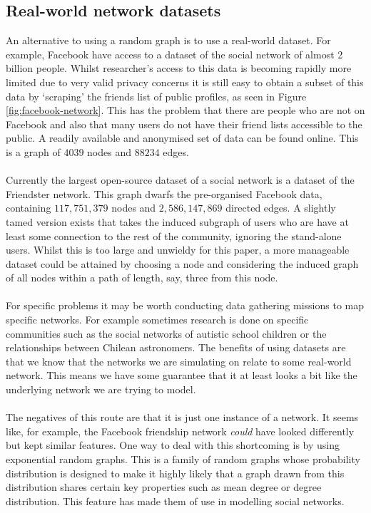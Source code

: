 \subsection{Real-world network datasets}
An alternative to using a random graph is to use a real-world dataset. For example, Facebook have access to a dataset of the social network of almost 2 billion people\cite{num-fb-users}. Whilst researcher's access to this data is becoming rapidly more limited due to very valid privacy concerns it is still easy to obtain a subset of this data by `scraping' the friends list of public profiles, as seen in Figure \ref{fig:facebook-network}. This has the problem that there are people who are not on Facebook and also that many users do not have their friend lists accessible to the public. A readily available and anonymised set of data can be found online\cite{fb-ego-data}. This is a graph of $4039$ nodes and $88234$ edges.\\
\\
Currently the largest open-source dataset of a social network is a dataset of the Friendster network\cite{friendster-data-archive}. This graph dwarfs the pre-organised Facebook data, containing $117,751,379$ nodes and $2,586,147,869$ directed edges. A slightly tamed version exists \cite{friendster-data-stanford} that takes the induced subgraph of users who are have at least some connection to the rest of the community, ignoring the stand-alone users. Whilst this is too large and unwieldy for this paper, a more manageable dataset could be attained by choosing a node and considering the induced graph of all nodes within a path of length, say, three from this node.\\
\\
For specific problems it may be worth conducting data gathering missions to map specific networks. For example sometimes research is done on specific communities such as the social networks of autistic school children\cite{anderson_locke_kretzmann_kasari_2015} or the relationships between Chilean astronomers\cite{chilean-astronomers}. The benefits of using datasets are that we know that the networks we are simulating on relate to some real-world network. This means we have some guarantee that it at least looks a bit like the underlying network we are trying to model.\\
\\
The negatives of this route are that it is just one instance of a network. It seems like, for example, the Facebook friendship network \textit{could} have looked differently but kept similar features. One way to deal with this shortcoming is by using exponential random graphs. This is a family of random graphs whose probability distribution is designed to make it highly likely that a graph drawn from this distribution shares certain key properties such as mean degree or degree distribution\cite{networks}. This feature has made them of use in modelling social networks\cite{exponential-random-graph}.
